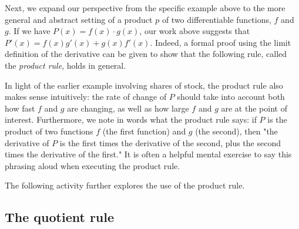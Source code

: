 Next, we expand our perspective from the specific example above to the more general and abstract setting of a product $p$ of two differentiable functions, $f$ and $g$.  If we have $P(x) = f(x) \cdot g(x)$, our work above suggests that $P'(x) = f(x) g'(x) + g(x) f'(x).$ Indeed, a formal proof using the limit definition of the derivative can be given to show that the following rule, called the \emph{product rule}, holds in general.



In light of the earlier example involving shares of stock, the product rule also makes sense intuitively:  the rate of change of $P$ should take into account both how fast $f$ and $g$ are changing, as well as how large $f$ and $g$ are at the point of interest.  Furthermore, we note in words what the product rule says:  if $P$ is the product of two functions $f$ (the first function) and $g$ (the second), then "the derivative of $P$ is the first times the derivative of the second, plus the second times the derivative of the first."  It is often a helpful mental exercise to say this phrasing aloud when executing the product rule.


The following activity further explores the use of the product rule.


\subsection*{The quotient rule}


